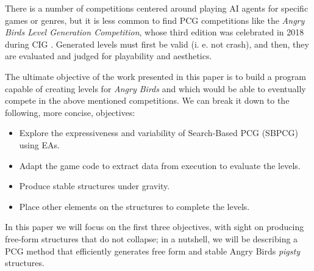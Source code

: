 \documentclass[sigconf]{acmart}
\begin{document}
There is a number of competitions centered around playing AI agents for 
specific 
games or genres, but it is less common to find PCG competitions like the 
\textit{Angry Birds Level Generation Competition}, whose third edition
was celebrated in 2018 during CIG \cite{aibirds}.
Generated levels must first be valid (i. e. not crash), and then,
they are evaluated and judged for playability and aesthetics.

The ultimate objective of the work presented in this paper is to
build a program capable of creating levels for \textit{Angry Birds}
and which would be able to eventually compete in the above mentioned
competitions. We can break it down to the following, more concise,
objectives: 

\begin{itemize}
	\item Explore the expressiveness and variability of Search-Based PCG 
	(SBPCG) using EAs.
	\item Adapt the game code to extract data from execution to 
	evaluate the levels.
	\item Produce stable structures under gravity.
	\item Place other elements on the structures to complete the levels.
\end{itemize} 

In this paper we will focus on the first three objectives, with sight
on producing free-form structures that do not collapse; in a nutshell,
we will be describing a PCG method that efficiently generates free
form and stable Angry Birds {\em pigsty} structures.


\end{document}

